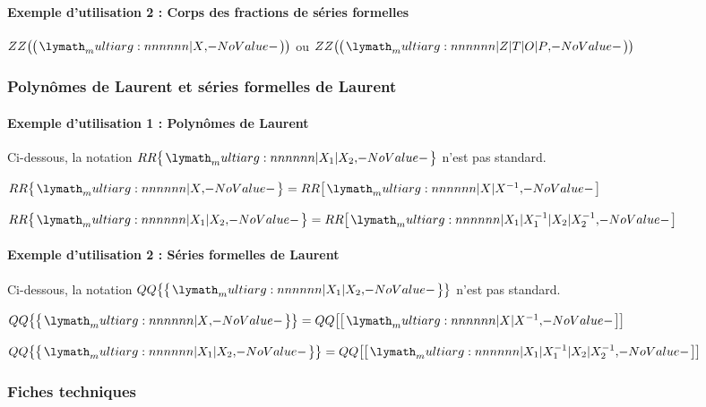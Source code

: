 \documentclass[12pt,a4paper]{article}
\newcommand\ZZ{ZZ}
\newcommand\QQ{QQ}
\newcommand\RR{RR}
\begin{document}
\paragraph{Exemple d'utilisation 2 : Corps des fractions de séries formelles}

\begin{latexex}
$\setseriefrac{\ZZ}{X}$
ou
$\setseriefrac{\ZZ}{Z | T | O | P}$
\end{latexex}




\subsubsection{Polynômes de Laurent et séries formelles de Laurent}

\paragraph{Exemple d'utilisation 1 : Polynômes de Laurent}

Ci-dessous, la notation $\setpolylaurent{\RR}{X_1 | X_2}$ n'est pas standard.

\begin{latexex}
 $\setpolylaurent{\RR}{X}
= \setpoly{\RR}{X | X^{-1}}$

 $\setpolylaurent{\RR}{X_1 | X_2}
= \setpoly{\RR}%
          {X_1 | X_1^{-1} %
         | X_2 | X_2^{-1}}$
\end{latexex}




\paragraph{Exemple d'utilisation 2 : Séries formelles de Laurent}

Ci-dessous, la notation $\setserielaurent{\QQ}{X_1 | X_2}$ n'est pas standard.

\begin{latexex}
 $\setserielaurent{\QQ}{X}
= \setserie{\QQ}{X | X^{-1}}$

 $\setserielaurent{\QQ}{X_1 | X_2} 
= \setserie{\QQ}%
           {X_1 | X_1^{-1} %
          | X_2 | X_2^{-1}}$
\end{latexex}




\subsubsection{Fiches techniques}
\end{document}
